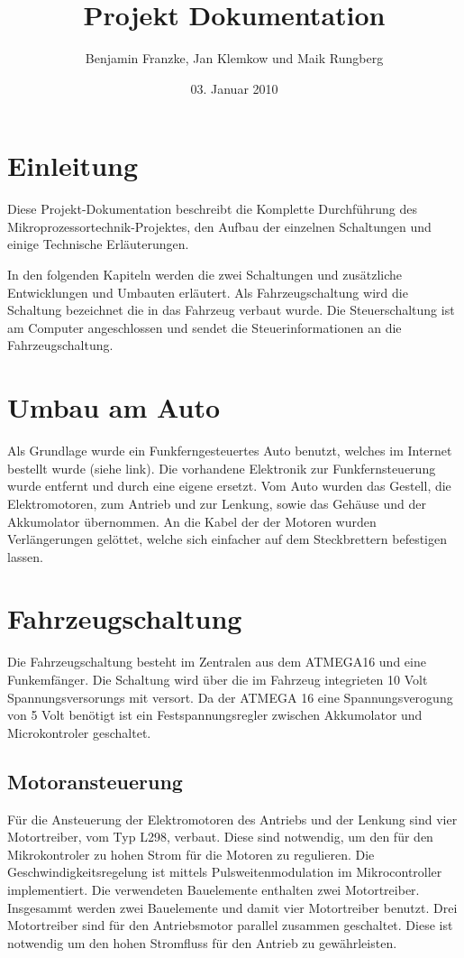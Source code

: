 \documentclass{scrartcl}
\title{Projekt Dokumentation}
\author{Benjamin Franzke, Jan Klemkow und Maik Rungberg}
\date{03. Januar 2010}
\begin{document}
\maketitle
\tableofcontents

\newpage

\section{Einleitung} %
	Diese Projekt-Dokumentation beschreibt die Komplette Durchführung des Mikroprozessortechnik-Projektes,
	den Aufbau der einzelnen Schaltungen und einige Technische Erläuterungen.

	In den folgenden Kapiteln werden die zwei Schaltungen und zusätzliche Entwicklungen und Umbauten erläutert.
	Als Fahrzeugschaltung wird die Schaltung bezeichnet die in das Fahrzeug verbaut wurde.
	Die Steuerschaltung ist am Computer angeschlossen und sendet die Steuerinformationen an die Fahrzeugschaltung.

\section{Umbau am Auto} %
	Als Grundlage wurde ein Funkferngesteuertes Auto benutzt,
	welches im Internet bestellt wurde (siehe link).
	Die vorhandene Elektronik zur Funkfernsteuerung wurde entfernt und durch eine eigene ersetzt.
	Vom Auto wurden das Gestell, die Elektromotoren, zum Antrieb und zur Lenkung,
	sowie das Gehäuse und der Akkumolator übernommen.
	An die Kabel der der Motoren wurden Verlängerungen gelöttet,
	welche sich einfacher auf dem Steckbrettern befestigen lassen.

\newpage

\section{Fahrzeugschaltung} %
	Die Fahrzeugschaltung besteht im Zentralen aus dem ATMEGA16 und eine Funkemfänger.
	Die Schaltung wird über die im Fahrzeug integrieten 10 Volt Spannungsversorungs mit versort.
	Da der ATMEGA 16 eine Spannungsverogung von 5 Volt benötigt ist ein Festspannungsregler
	zwischen Akkumolator und Microkontroler geschaltet.

	\subsection{Motoransteuerung}
		Für die Ansteuerung der Elektromotoren des Antriebs und der Lenkung sind vier Motortreiber, vom Typ L298, verbaut.
		Diese sind notwendig, um den für den Mikrokontroler zu hohen Strom für die Motoren zu regulieren.
		Die Geschwindigkeitsregelung ist mittels Pulsweitenmodulation im Mikrocontroller implementiert.
		Die verwendeten Bauelemente enthalten zwei Motortreiber. Insgesammt werden zwei Bauelemente und damit vier Motortreiber benutzt.
		Drei Motortreiber sind für den Antriebsmotor parallel zusammen geschaltet.
		Diese ist notwendig um den hohen Stromfluss für den Antrieb zu gewährleisten.
		
\end{document}
